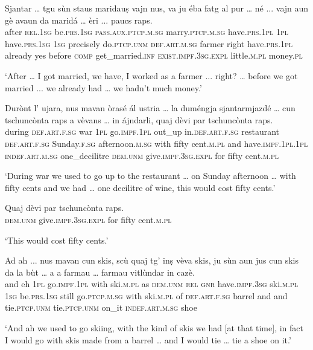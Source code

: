 \begin{linenumbers}
\gll    Sjantar … tgu sùn staus maridauṣ vajn nus, va ju éba fatg al pur … né ... vajn aun gè avaun da maridá … èri ... paucs raps.\\
after {} \textsc{rel.1sg} be.\textsc{prs.1sg} \textsc{pass.aux.ptcp.m.sg} marry.\textsc{ptcp.m.sg} have.\textsc{prs.1pl} \textsc{1pl} have.\textsc{prs.1sg} \textsc{1sg} precisely do.\textsc{ptcp.unm} \textsc{def.art.m.sg} farmer {} right {} have.\textsc{prs.1pl} already yes before \textsc{comp} get\_married.\textsc{inf} {} \textsc{exist.impf.3sg.expl} {} little.\textsc{m.pl} money.\textsc{pl}\\
\end{linenumbers}
\medskip
\glt `After … I got married, we have, I worked as a farmer ... right? … before we got married ... we already had  … we hadn’t much money.'
\medskip

\begin{linenumbers}
\gll  Durònt l’ ujara, nus mavan òrasé ál ustria … la duméngja sjantarmjazdé … cun tschuncònta raps a vèvans … in ájndarli, quaj dèvi par tschuncònta raps.  \\
during \textsc{def.art.f.sg} war \textsc{1pl} go.\textsc{impf.1pl} out\_up in.\textsc{def.art.f.sg} restaurant {} \textsc{def.art.f.sg} Sunday.\textsc{f.sg} afternoon.\textsc{m.sg} {} with fifty cent.\textsc{m.pl} and have.\textsc{impf.1pl.1pl} {} \textsc{indef.art.m.sg} one\_decilitre \textsc{dem.unm} give.\textsc{impf.3sg.expl} for fifty cent.\textsc{m.pl} \\
\end{linenumbers}
\medskip
\glt `During war we used to go up to the restaurant … on Sunday afternoon … with fifty cents and we had … one decilitre of wine, this would cost fifty cents.'
\medskip

\begin{linenumbers}
\gll    Quaj dèvi par tschuncònta raps.\\
\textsc{dem.unm} give.\textsc{impf.3sg.expl} for fifty cent.\textsc{m.pl} \\
\end{linenumbers}
\medskip
\glt `This would cost fifty cents.'
\medskip

\begin{linenumbers}
\gll    Ad ah ... nus mavan cun skis, scù quaj tg’ inṣ vèva skis, ju sùn aun jus cun skis da la bùt … a a farmau … farmau vitlùndar in cazè.\\ 
and eh {} \textsc{1pl} go.\textsc{impf.1pl} with ski.\textsc{m.pl} as \textsc{dem.unm} \textsc{rel} \textsc{gnr} have.\textsc{impf.3sg} ski.\textsc{m.pl} \textsc{1sg} be.\textsc{prs.1sg} still go.\textsc{ptcp.m.sg}  with ski.\textsc{m.pl} of \textsc{def.art.f.sg} barrel {} and and tie.\textsc{ptcp.unm} {} tie.\textsc{ptcp.unm} on\_it \textsc{indef.art.m.sg} shoe\\
\end{linenumbers} 
\medskip
\glt `And ah we used to go skiing, with the kind of skis we had [at that time], in fact I would go with skis made from a barrel … and I would tie … tie a shoe on it.'
\medskip

